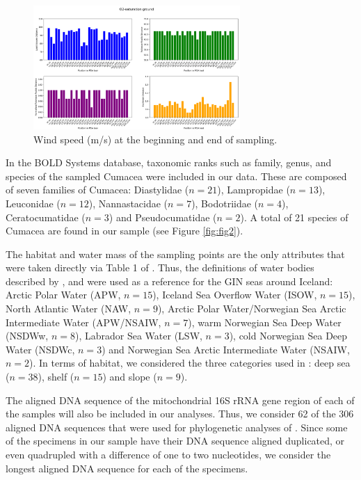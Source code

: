 \begin{figure}[]
    \centering
    \includegraphics[width=0.7\textwidth]{figure6.png}
    \caption{Wind speed (m/s) at the beginning and end of sampling. \label{fig:fig1f}}
\end{figure}

In the BOLD Systems database, taxonomic ranks such as family, genus, and species of the sampled Cumacea were included in our data. These are composed of seven families of Cumacea: Diastylidae (\( n=21 \)), Lampropidae (\( n=13 \)), Leuconidae (\( n=12 \)), Nannastacidae (\( n=7 \)), Bodotriidae (\( n=4 \)), Ceratocumatidae (\( n=3 \)) and Pseudocumatidae (\( n=2 \)). A total of 21 species of Cumacea are found in our sample (see Figure \ref{fig:fig2}).

The habitat and water mass of the sampling points are the only attributes that were taken directly via Table 1 of \cite{uhlir_adding_2021}. Thus, the definitions of water bodies described by \cite{hansen_north_2000}, \cite{brix_distribution_2010} and \cite{ostmann_marine_2014} were used as a reference for the GIN seas around Iceland: Arctic Polar Water (APW, \( n=15 \)), Iceland Sea Overflow Water (ISOW, \( n=15 \)), North Atlantic Water (NAW, \( n=9 \)), Arctic Polar Water/Norwegian Sea Arctic Intermediate Water (APW/NSAIW, \( n=7 \)), warm Norwegian Sea Deep Water (NSDWw, \( n=8 \)), Labrador Sea Water (LSW, \( n=3 \)), cold Norwegian Sea Deep Water (NSDWc, \( n=3 \)) and Norwegian Sea Arctic Intermediate Water (NSAIW, \( n=2 \)). In terms of habitat, we considered the three categories used in \cite{uhlir_adding_2021}: deep sea (\( n=38 \)), shelf (\( n=15 \)) and slope (\( n=9 \)).

The aligned DNA sequence of the mitochondrial 16S rRNA gene region of each of the samples will also be included in our analyses. Thus, we consider 62 of the 306 aligned DNA sequences that were used for phylogenetic analyses of \cite{uhlir_adding_2021}. Since some of the specimens in our sample have their DNA sequence aligned duplicated, or even quadrupled with a difference of one to two nucleotides, we consider the longest aligned DNA sequence for each of the specimens.

